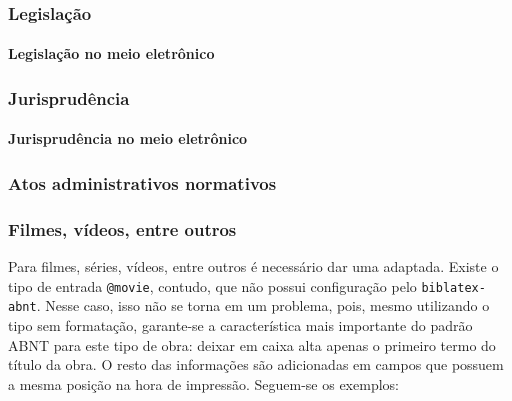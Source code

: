 


\subsubsection{Legislação}


\paragraph{Legislação no meio eletrônico}


\subsubsection{Jurisprudência}


\paragraph{Jurisprudência no meio eletrônico}

\subsubsection{Atos administrativos normativos}


\subsubsection{Filmes, vídeos, entre outros}
Para filmes, séries, vídeos, entre outros é necessário dar uma adaptada. Existe o tipo de entrada \texttt{@movie}, contudo, que não possui configuração pelo \texttt{biblatex-abnt}. Nesse caso, isso não se torna em um problema, pois, mesmo utilizando o tipo sem formatação, garante-se a característica mais importante do padrão ABNT para este tipo de obra: deixar em caixa alta apenas o primeiro termo do título da obra. O resto das informações são adicionadas em campos que possuem a mesma posição na hora de impressão\footnotemark. Seguem-se os exemplos:

